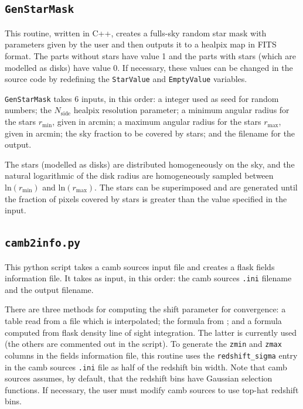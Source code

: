 \documentclass[12pt]{book} %
\newcommand{\nv}[1]{\mathrm{#1}}                 %
\begin{document}
\subsection{{\tt GenStarMask}}
\label{sec:genstarmask}

This routine, written in C++, creates a fulls-sky random star mask with parameters given by the user and 
then outputs it to a {\sc healpix} map in FITS format. The parts without stars have value 1 and 
the parts with stars (which are modelled as disks) have value 0. If necessary, these values 
can be changed in the source code by redefining the {\tt StarValue} and {\tt EmptyValue} 
variables.

{\tt GenStarMask} takes 6 inputs, in this order: a integer used as seed for random numbers; 
the $N_{\nv{side}}$ {\sc healpix} resolution parameter; a minimum angular radius for the stars $r_{\nv{min}}$, given 
in arcmin; a maximum angular radius for the stars $r_{\nv{max}}$, given in arcmin; the sky fraction to be covered 
by stars; and the filename for the output.

The stars (modelled as disks) are distributed homogeneously on the sky, and the natural 
logarithmic of the disk radius are homogeneously sampled between $\nv{ln}(r_{\nv{min}})$ and 
$\nv{ln}(r_{\nv{max}})$. The stars can be superimposed and are generated until the fraction of 
pixels covered by stars is greater than the value specified in the input.

\subsection{{\tt camb2info.py}}
\label{sec:camb2info}

This {\sc python} script takes a {\sc camb sources} input file and creates a 
{\sc flask} fields information file. It takes as input, in this order: 
the {\sc camb sources} {\tt .ini} filename and the output filename. 

There are three methods for computing the shift parameter for convergence:
a table read from a file which is interpolated; the formula from 
\citet{Hilbert11x}; and a formula computed from {\sc flask} 
density line of sight integration. The latter is currently used (the others 
are commented out in the script). To generate the {\tt zmin} and {\tt zmax} 
columns in the fields information file, this routine uses the {\tt redshift\_sigma} 
entry in the {\sc camb sources} {\tt .ini} file as half of the redshift bin width. 
Note that {\sc camb sources} assumes, by default, that the redshift bins have Gaussian selection 
functions. If necessary, the user must modify {\sc camb sources} to use 
top-hat redshift bins.
\end{document}
